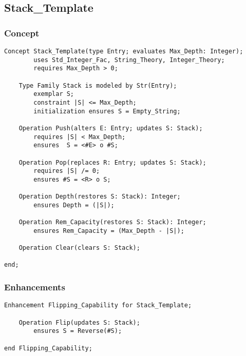 	\subsection{Stack\_Template}	%

		\subsubsection{Concept}	%

\begin{lstlisting}[language=resolve]
Concept Stack_Template(type Entry; evaluates Max_Depth: Integer);
        uses Std_Integer_Fac, String_Theory, Integer_Theory;
        requires Max_Depth > 0;

    Type Family Stack is modeled by Str(Entry);
        exemplar S;
        constraint |S| <= Max_Depth;
        initialization ensures S = Empty_String;

    Operation Push(alters E: Entry; updates S: Stack); 
        requires |S| < Max_Depth;
        ensures  S = <#E> o #S;

    Operation Pop(replaces R: Entry; updates S: Stack);
        requires |S| /= 0;
        ensures #S = <R> o S;

    Operation Depth(restores S: Stack): Integer;
        ensures Depth = (|S|);

    Operation Rem_Capacity(restores S: Stack): Integer;
        ensures Rem_Capacity = (Max_Depth - |S|);

    Operation Clear(clears S: Stack);

end;
\end{lstlisting}

		\subsubsection{Enhancements}	%

\begin{lstlisting}[language=resolve]
Enhancement Flipping_Capability for Stack_Template;

	Operation Flip(updates S: Stack);
		ensures S = Reverse(#S);

end Flipping_Capability;
\end{lstlisting}

